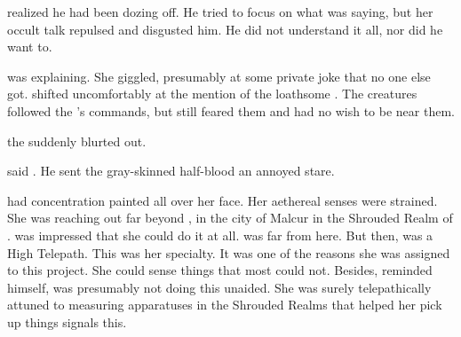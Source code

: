 \Teshrial realized he had been dozing off. 
He tried to focus on what \Urizeth was saying, but her occult talk repulsed and disgusted him.
He did not understand it all, nor did he want to. 

 \Urizeth was explaining. 
She giggled, presumably at some private joke that no one else got. 
\Teshrial shifted uncomfortably at the mention of the loathsome \noggyaleth. 
The creatures followed the \resphain's commands, but \Teshrial still feared them and had no wish to be near them. 



\begin{comment}
  \subsection{Achsah detects Ishnaruchaefir}
\end{comment}

 the \bezed \Achsah suddenly blurted out. 

 said \Teshrial.
He sent the gray-skinned half-blood an annoyed stare. 


\Achsah had concentration painted all over her face.
Her aethereal senses were strained. 
She was reaching out far beyond \Nyx, in the city of Malcur in the Shrouded Realm of \Azmith. 
\Teshrial was impressed that she could do it at all. 
\Malcur was far from here.
But then, \Achsah was a High Telepath. 
This was her specialty. 
It was one of the reasons she was assigned to this project. 
She could sense things that most \resphain could not. 
Besides, \Teshrial reminded himself, \Achsah was presumably not doing this unaided. 
She was surely telepathically attuned to measuring apparatuses in the Shrouded Realms that helped her pick up things signals this. 

